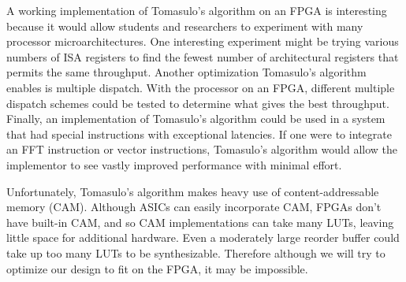 \documentclass[12pt]{article}
\begin{document}
A working implementation of Tomasulo's algorithm on an FPGA is interesting because it would allow students and researchers to experiment with many processor microarchitectures. One
interesting experiment might be trying various numbers of ISA registers to find the fewest number of architectural registers that permits the same throughput. Another optimization
Tomasulo's algorithm enables is multiple dispatch. With the processor on an FPGA, different multiple dispatch schemes could be tested to determine what gives the best throughput.
Finally, an implementation of Tomasulo's algorithm could be used in a system that had special instructions with exceptional latencies. If one were to integrate an FFT instruction or
vector instructions, Tomasulo's algorithm would allow the implementor to see vastly improved performance with minimal effort.

Unfortunately, Tomasulo's algorithm makes heavy use of content-addressable memory (CAM). Although ASICs can easily incorporate CAM, FPGAs don't have built-in CAM, and so CAM
implementations can take many LUTs, leaving little space for additional hardware. Even a moderately large reorder buffer could take up too many LUTs to be synthesizable. Therefore
although we will try to optimize our design to fit on the FPGA, it may be impossible.

 
\end{document}
